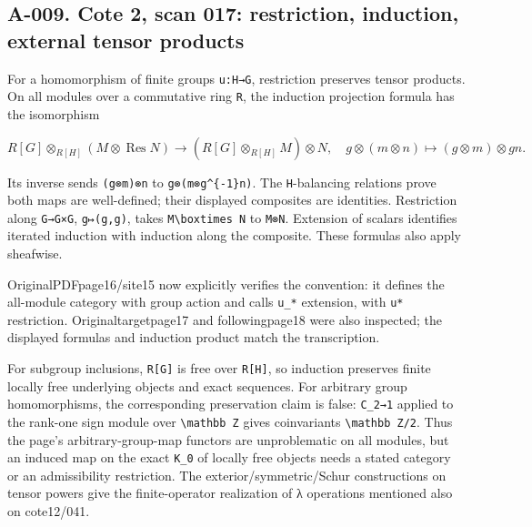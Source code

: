 \documentclass[
  10pt,
]{article}
\begin{document}
\subsection{A-009. Cote 2, scan 017: restriction, induction, external
tensor
products}\label{a-009.-cote-2-scan-017-restriction-induction-external-tensor-products}

For a homomorphism of finite groups
\texttt{\small u:\allowbreak{}H→\allowbreak{}G}, restriction preserves
tensor products. On all modules over a commutative ring
\texttt{\small R}, the induction projection formula has the isomorphism

\[
R[G]\otimes_{R[H]}(M\otimes\operatorname{Res}N)
\longrightarrow (R[G]\otimes_{R[H]}M)\otimes N,
\quad g\otimes(m\otimes n)\longmapsto(g\otimes m)\otimes gn.
\]

Its inverse sends
\texttt{\small (\allowbreak{}g⊗\allowbreak{}m)\allowbreak{}⊗\allowbreak{}n}
to
\texttt{\small g⊗\allowbreak{}(\allowbreak{}m⊗\allowbreak{}g\textasciicircum{}\{-\allowbreak{}1\}n)\allowbreak{}}.
The \texttt{\small H}-balancing relations prove both maps are
well-defined; their displayed composites are identities. Restriction
along \texttt{\small G→\allowbreak{}G×G},
\texttt{\small g↦(\allowbreak{}g,\allowbreak{}g)\allowbreak{}}, takes
\texttt{\small M\textbackslash{}boxtimes N} to
\texttt{\small M⊗\allowbreak{}N}. Extension of scalars identifies
iterated induction with induction along the composite. These formulas
also apply sheafwise.

OriginalPDFpage16/site15 now explicitly verifies the convention: it
defines the all-module category with group action and calls
\texttt{\small u\_\allowbreak{}*} extension, with \texttt{\small u*}
restriction. Originaltargetpage17 and followingpage18 were also
inspected; the displayed formulas and induction product match the
transcription.

For subgroup inclusions, \texttt{\small R[\allowbreak{}G]\allowbreak{}}
is free over \texttt{\small R[\allowbreak{}H]\allowbreak{}}, so
induction preserves finite locally free underlying objects and exact
sequences. For arbitrary group homomorphisms, the corresponding
preservation claim is false:
\texttt{\small C\_\allowbreak{}2→\allowbreak{}1} applied to the rank-one
sign module over \texttt{\small \textbackslash{}mathbb Z} gives
coinvariants \texttt{\small \textbackslash{}mathbb Z/\allowbreak{}2}.
Thus the page's arbitrary-group-map functors are unproblematic on all
modules, but an induced map on the exact
\texttt{\small K\_\allowbreak{}0} of locally free objects needs a stated
category or an admissibility restriction. The exterior/symmetric/Schur
constructions on tensor powers give the finite-operator realization of λ
operations mentioned also on cote12/041.
\end{document}
